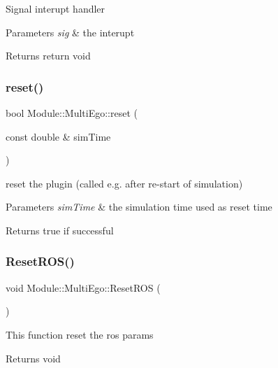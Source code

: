 Signal interupt handler 
\begin{DoxyParams}{Parameters}
{\em sig} & the interupt \\
\hline
\end{DoxyParams}
\begin{DoxyReturn}{Returns}
return void 
\end{DoxyReturn}
\mbox{\label{classModule_1_1MultiEgo_ae3c4d04e688fdff789af744205ce6480}} 
\subsubsection{\texorpdfstring{reset()}{reset()}}
{\footnotesize\ttfamily bool Module\+::\+Multi\+Ego\+::reset (\begin{DoxyParamCaption}\item[{const double \&}]{sim\+Time }\end{DoxyParamCaption})\hspace{0.3cm}{\ttfamily [virtual]}}

reset the plugin (called e.\+g. after re-\/start of simulation) 
\begin{DoxyParams}{Parameters}
{\em sim\+Time} & the simulation time used as reset time \\
\hline
\end{DoxyParams}
\begin{DoxyReturn}{Returns}
true if successful 
\end{DoxyReturn}
\mbox{\label{classModule_1_1MultiEgo_a9e99889c2f05d5cf14017e114b4fde37}} 
\subsubsection{\texorpdfstring{Reset\+R\+O\+S()}{ResetROS()}}
{\footnotesize\ttfamily void Module\+::\+Multi\+Ego\+::\+Reset\+R\+OS (\begin{DoxyParamCaption}{ }\end{DoxyParamCaption})}

This function reset the ros params \begin{DoxyReturn}{Returns}
void 
\end{DoxyReturn}
\mbox{\label{classModule_1_1MultiEgo_a2bd4f7f6cac18fcf0a1442b58fc5ffe9}} 
